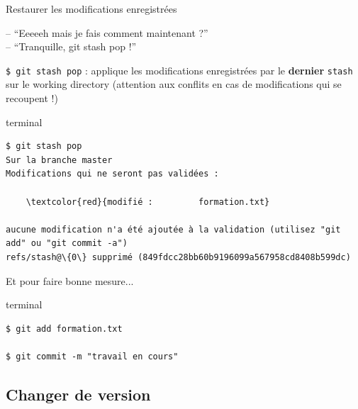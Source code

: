 \documentclass[usepdftitle=false]{beamer}
\def\seplength{.3\topsep}
\newcommand{\Pause}{%
\ifdef{\Release}
  {\pause}
  {}
}
\begin{document}
\begin{frame}[fragile]{Restaurer les modifications enregistrées}
	\begin{block}{}
		-- \enquote{Eeeeeh mais je fais comment maintenant ?} \\
		-- \enquote{Tranquille, git stash pop !}
	\end{block}

	\Pause

	\verb+$ git stash pop+ : applique les modifications enregistrées par le \textbf{dernier} \verb+stash+ sur le working directory (attention aux conflits en cas de modifications qui se recoupent !)
	\begin{beamercolorbox}[rounded=true,shadow=true]{terminal}
\vspace{-\seplength}
\begin{Verbatim}
$ git stash pop
Sur la branche master
Modifications qui ne seront pas validées :

	\textcolor{red}{modifié :         formation.txt}

aucune modification n'a été ajoutée à la validation (utilisez "git add" ou "git commit -a")
refs/stash@\{0\} supprimé (849fdcc28bb60b9196099a567958cd8408b599dc)
	\end{Verbatim}
	\end{beamercolorbox}

	\Pause

	Et pour faire bonne mesure...
	\begin{beamercolorbox}[rounded=true,shadow=true]{terminal}
\vspace{-\seplength}
\begin{Verbatim}
$ git add formation.txt

$ git commit -m "travail en cours"
\end{Verbatim}
	\end{beamercolorbox}
\end{frame}

\subsection{Changer de version}
\end{document}
